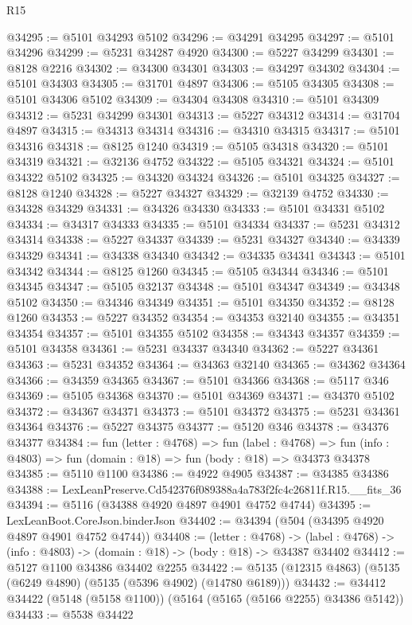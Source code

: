 \begin{lexlean}{R15}
\begin{coremodule}
{{{{{{{{{{{@34295 := @5101 @34293 @5102
@34296 := @34291 @34295
@34297 := @5101 @34296
@34299 := @5231 @34287 @4920
@34300 := @5227 @34299
@34301 := @8128 @2216
@34302 := @34300 @34301
@34303 := @34297 @34302
@34304 := @5101 @34303
@34305 := @31701 @4897
@34306 := @5105 @34305
@34308 := @5101 @34306 @5102
@34309 := @34304 @34308
@34310 := @5101 @34309
@34312 := @5231 @34299 @34301
@34313 := @5227 @34312
@34314 := @31704 @4897
@34315 := @34313 @34314
@34316 := @34310 @34315
@34317 := @5101 @34316
@34318 := @8125 @1240
@34319 := @5105 @34318
@34320 := @5101 @34319
@34321 := @32136 @4752
@34322 := @5105 @34321
@34324 := @5101 @34322 @5102
@34325 := @34320 @34324
@34326 := @5101 @34325
@34327 := @8128 @1240
@34328 := @5227 @34327
@34329 := @32139 @4752
@34330 := @34328 @34329
@34331 := @34326 @34330
@34333 := @5101 @34331 @5102
@34334 := @34317 @34333
@34335 := @5101 @34334
@34337 := @5231 @34312 @34314
@34338 := @5227 @34337
@34339 := @5231 @34327
@34340 := @34339 @34329
@34341 := @34338 @34340
@34342 := @34335 @34341
@34343 := @5101 @34342
@34344 := @8125 @1260
@34345 := @5105 @34344
@34346 := @5101 @34345
@34347 := @5105 @32137
@34348 := @5101 @34347
@34349 := @34348 @5102
@34350 := @34346 @34349
@34351 := @5101 @34350
@34352 := @8128 @1260
@34353 := @5227 @34352
@34354 := @34353 @32140
@34355 := @34351 @34354
@34357 := @5101 @34355 @5102
@34358 := @34343 @34357
@34359 := @5101 @34358
@34361 := @5231 @34337 @34340
@34362 := @5227 @34361
@34363 := @5231 @34352
@34364 := @34363 @32140
@34365 := @34362 @34364
@34366 := @34359 @34365
@34367 := @5101 @34366
@34368 := @5117 @346
@34369 := @5105 @34368
@34370 := @5101 @34369
@34371 := @34370 @5102
@34372 := @34367 @34371
@34373 := @5101 @34372
@34375 := @5231 @34361 @34364
@34376 := @5227 @34375
@34377 := @5120 @346
@34378 := @34376 @34377
@34384 := fun (letter : @4768) =>
  fun (label : @4768) =>
  fun (info : @4803) => fun (domain : @18) => fun (body : @18) => @34373 @34378
@34385 := @5110 @1100
@34386 := @4922 @4905
@34387 := @34385 @34386
@34388 := LexLeanPreserve.Cd542376f089388a4a783f2fc4c26811f.R15.__fits_36
@34394 := @5116 (@34388 @4920 @4897 @4901 @4752 @4744)
@34395 := LexLeanBoot.CoreJson.binderJson
@34402 := @34394 (@504 (@34395 @4920 @4897 @4901 @4752 @4744))
@34408 := (letter : @4768) ->
  (label : @4768) -> (info : @4803) -> (domain : @18) -> (body : @18) -> @34387 @34402
@34412 := @5127 @1100 @34386 @34402 @2255
@34422 := @5135 (@12315 @4863) (@5135 (@6249 @4890) (@5135 (@5396 @4902) (@14780 @6189)))
@34432 := @34412 @34422 (@5148 (@5158 @1100)) (@5164 (@5165 (@5166 @2255) @34386 @5142))
@34433 := @5538 @34422
}}}}}}}}}}}
\end{coremodule}
\end{lexlean}
